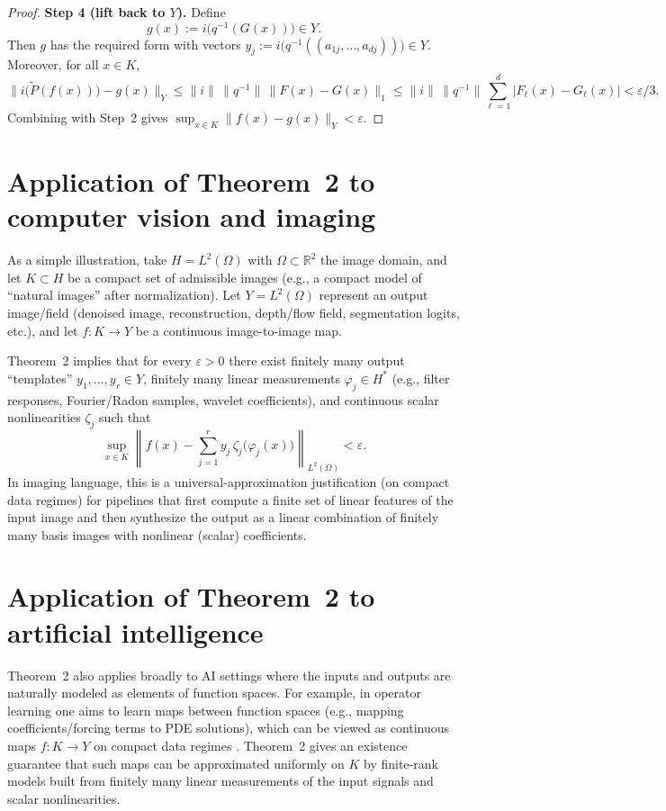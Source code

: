 \documentclass[final,12pt]{colt2026} %
\begin{document}
\begin{proof}
\textbf{Step 4 (lift back to $Y$).}
Define
\[
  g(x):=i\bigl(q^{-1}(G(x))\bigr)\in Y.
\]
Then $g$ has the required form with vectors $y_j:=i\bigl(q^{-1}((a_{1j},\dots,a_{dj}))\bigr)\in Y$.
Moreover, for all $x\in K$,
\[
  \|i\bigl(\widetilde P(f(x))\bigr)-g(x)\|_Y
  \le \|i\|\,\|q^{-1}\|\,\|F(x)-G(x)\|_1
  \le \|i\|\,\|q^{-1}\|\sum_{\ell=1}^d |F_\ell(x)-G_\ell(x)|
  <\varepsilon/3.
\]
Combining with Step~2 gives $\sup_{x\in K}\|f(x)-g(x)\|_Y<\varepsilon$.
\end{proof}

\section{Application of Theorem~2 to computer vision and imaging}
\label{app:cv}

As a simple illustration, take $H=L^2(\Omega)$ with $\Omega\subset\mathbb{R}^2$ the image domain, and let $K\subset H$ be a compact set of admissible images (e.g., a compact model of ``natural images'' after normalization).
Let $Y=L^2(\Omega)$ represent an output image/field (denoised image, reconstruction, depth/flow field, segmentation logits, etc.), and let $f\colon K\to Y$ be a continuous image-to-image map.

Theorem~2 implies that for every $\varepsilon>0$ there exist finitely many output ``templates'' $y_1,\dots,y_r\in Y$, finitely many linear measurements $\varphi_j\in H^*$ (e.g., filter responses, Fourier/Radon samples, wavelet coefficients), and continuous scalar nonlinearities $\zeta_j$ such that \cite{natterer_ct,adler_oktem_learned,mallat_wavelet}
\[
  \sup_{x\in K}\left\|f(x)-\sum_{j=1}^r y_j\,\zeta_j\bigl(\varphi_j(x)\bigr)\right\|_{L^2(\Omega)}<\varepsilon.
\]
In imaging language, this is a universal-approximation justification (on compact data regimes) for pipelines that first compute a finite set of linear features of the input image and then synthesize the output as a linear combination of finitely many basis images with nonlinear (scalar) coefficients.

\section{Application of Theorem~2 to artificial intelligence}
\label{app:ai}

Theorem~2 also applies broadly to AI settings where the inputs and outputs are naturally modeled as elements of function spaces.
For example, in operator learning one aims to learn maps between function spaces (e.g., mapping coefficients/forcing terms to PDE solutions), which can be viewed as continuous maps $f\colon K\to Y$ on compact data regimes \cite{kovachki_neuraloperator,li_fno,lu_deeponet}.
Theorem~2 gives an existence guarantee that such maps can be approximated uniformly on $K$ by finite-rank models built from finitely many linear measurements of the input signals and scalar nonlinearities.
\end{document}
